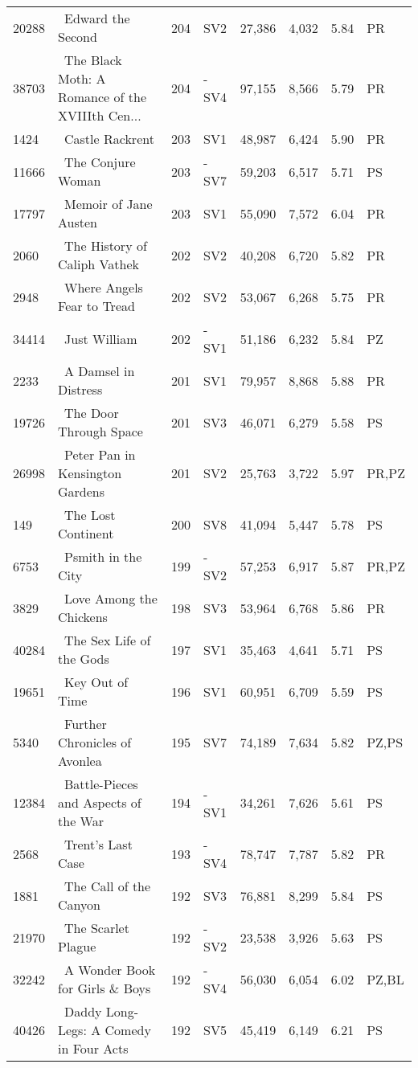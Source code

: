 \begin{longtable}{l | l | l | l | l | l | l | l}
20288 & ~Edward the Second & 204 & SV2 & 27,386 & 4,032 & 5.84 & PR\\
38703 & ~The Black Moth: A Romance of the XVIIIth Cen... & 204 & -SV4 & 97,155 & 8,566 & 5.79 & PR\\
1424 & ~Castle Rackrent & 203 & SV1 & 48,987 & 6,424 & 5.90 & PR\\
11666 & ~The Conjure Woman & 203 & -SV7 & 59,203 & 6,517 & 5.71 & PS\\
17797 & ~Memoir of Jane Austen & 203 & SV1 & 55,090 & 7,572 & 6.04 & PR\\
2060 & ~The History of Caliph Vathek & 202 & SV2 & 40,208 & 6,720 & 5.82 & PR\\
2948 & ~Where Angels Fear to Tread & 202 & SV2 & 53,067 & 6,268 & 5.75 & PR\\
34414 & ~Just William & 202 & -SV1 & 51,186 & 6,232 & 5.84 & PZ\\
2233 & ~A Damsel in Distress & 201 & SV1 & 79,957 & 8,868 & 5.88 & PR\\
19726 & ~The Door Through Space & 201 & SV3 & 46,071 & 6,279 & 5.58 & PS\\
26998 & ~Peter Pan in Kensington Gardens & 201 & SV2 & 25,763 & 3,722 & 5.97 & PR,PZ\\
149 & ~The Lost Continent & 200 & SV8 & 41,094 & 5,447 & 5.78 & PS\\
6753 & ~Psmith in the City & 199 & -SV2 & 57,253 & 6,917 & 5.87 & PR,PZ\\
3829 & ~Love Among the Chickens & 198 & SV3 & 53,964 & 6,768 & 5.86 & PR\\
40284 & ~The Sex Life of the Gods & 197 & SV1 & 35,463 & 4,641 & 5.71 & PS\\
19651 & ~Key Out of Time & 196 & SV1 & 60,951 & 6,709 & 5.59 & PS\\
5340 & ~Further Chronicles of Avonlea & 195 & SV7 & 74,189 & 7,634 & 5.82 & PZ,PS\\
12384 & ~Battle-Pieces and Aspects of the War & 194 & -SV1 & 34,261 & 7,626 & 5.61 & PS\\
2568 & ~Trent's Last Case & 193 & -SV4 & 78,747 & 7,787 & 5.82 & PR\\
1881 & ~The Call of the Canyon & 192 & SV3 & 76,881 & 8,299 & 5.84 & PS\\
21970 & ~The Scarlet Plague & 192 & -SV2 & 23,538 & 3,926 & 5.63 & PS\\
32242 & ~A Wonder Book for Girls \& Boys & 192 & -SV4 & 56,030 & 6,054 & 6.02 & PZ,BL\\
40426 & ~Daddy Long-Legs: A Comedy in Four Acts & 192 & SV5 & 45,419 & 6,149 & 6.21 & PS\\

\end{longtable}
